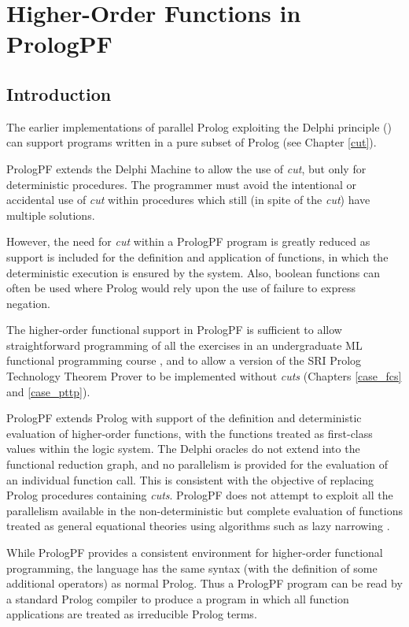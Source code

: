 \chapter{Higher-Order Functions in PrologPF}
\label{functions}

\section{Introduction}

The earlier implementations of parallel Prolog exploiting the Delphi
principle (\cite{CA87,Clo87,Wre90,Kle91,Sar95})
can support programs written in a pure subset of Prolog (see Chapter
\ref{cut}).

PrologPF extends the Delphi Machine to allow the use of \textit{cut},
but only for
deterministic procedures.  The programmer must avoid the
intentional or accidental use of \textit{cut} within
procedures which still (in spite of the \textit{cut}) have
multiple solutions.  

However, the need for \textit{cut} within a
PrologPF program is greatly reduced as
support is included for the definition and application
of functions, in which the deterministic
execution is ensured by the system.  Also, boolean functions can often
be used where Prolog would rely upon the use of failure to express negation.

The higher-order functional support in PrologPF is sufficient to allow
straightforward programming of all the exercises in an undergraduate ML
functional programming course \cite{Pau88}, and to allow a version of the SRI Prolog 
Technology Theorem Prover \cite{Sti88} to be implemented without \textit{cuts}
(Chapters \ref{case_fcs} and \ref{case_pttp}).

PrologPF extends Prolog with support of the definition and deterministic
evaluation of higher-order functions, with the functions treated as
first-class values within the logic system.  The Delphi oracles do not
extend into the functional reduction graph, and no parallelism is provided for
the evaluation of an individual function call.  This is consistent with the
objective of replacing Prolog procedures containing \textit{cuts}.  
PrologPF does not
attempt to exploit all the parallelism available in the non-deterministic but
complete evaluation of functions treated as general equational theories using
algorithms such as lazy narrowing \cite{CL91}.

While PrologPF provides a consistent environment for
higher-order functional
programming, the language has the same syntax (with the definition of some
additional operators) as normal Prolog.  Thus a PrologPF program can be
read by a standard Prolog compiler to produce a program in which all
function applications are treated as irreducible Prolog terms.

